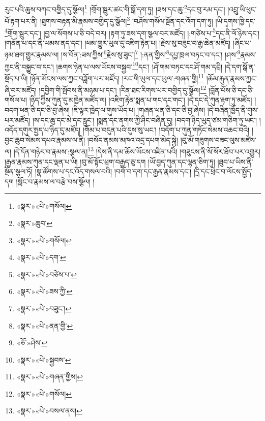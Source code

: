 རུང་པའི་ཆུས་བཀང་བགྱིད་དུ་སྩོལ།\footnote{«སྣར་»«པེ་»གསོལ།} །གྲོག་སྦུར་ཚང་གི་སྒོ་དག་ཏུ། །ཟས་དང་ཆུ་\footnote{«སྣར་»ཆུབ་}དང་བུ་རམ་དང་། །འབྲུ་ཡི་ཕུང་པོ་རྟག་པར་ནི། །ཐུགས་བརྟན་མི་རྣམས་བགྱིད་དུ་སྩོལ།\footnote{«སྣར་»«པེ་»གསོལ།} །བཤོས་གསོལ་སྔོན་དང་འོག་དག་ཏུ། །ཡི་དྭགས་ཁྱི་དང་\footnote{«སྣར་»«པེ་»དག་}གྲོག་སྦུར་དང་། །བྱ་ལ་སོགས་པ་ཅི་བདེ་བར། །རྟག་ཏུ་ཟས་དག་སྩལ་བར་མཛོད། །:གཙེས་པ་\footnote{«སྣར་»«པེ་»བཙེས་པ་}དང་ནི་ལོ་ཉེས་དང་། །གནོན་པ་དང་ནི་ཡམས་ནད་དང་། །ཕམ་གྱུར་ཡུལ་དུ་འཇིག་རྟེན་པ། །རྗེས་སུ་བཟུང་བ་རྒྱ་ཆེན་མཛོད། །ཞིང་པ་ཉམ་ཐག་གྱུར་རྣམས་ལ། །ས་བོན་:ཟས་ཀྱིས་\footnote{«སྣར་»«པེ་»ཟས་ཀྱི་}རྗེས་སུ་ཟུང་།\footnote{«སྣར་»«པེ་»བཟུང་།} །:ནན་གྱིས་\footnote{«སྣར་»«པེ་»ནན་གྱི་}དཔྱ་ཁྲལ་བཏང་བ་དང་། །ཤས་\footnote{«ཅོ་»ཤེས་}རྣམས་ཀྱང་ནི་བསྐྱུང་བ་དང་། །ཆགས་ཉེན་པ་ལས་ཡོངས་བསྐྱབ་\footnote{«སྣར་»«པེ་»སྐྱབས་}དང་། །ཤོ་གམ་བཏང་དང་ཤོ་གམ་དབྲི། །དེ་དག་སྒོ་ན་སྡོད་པ་ཡི། །ཉོན་མོངས་ལས་ཀྱང་བཟློག་པར་མཛོད། །རང་གི་ཡུལ་དང་ཡུལ་:གཞན་གྱི།\footnote{«སྣར་»«པེ་»གཞན་གྱིས།} །ཆོམ་རྐུན་རྣམས་ཀྱང་ཞི་བར་མཛོད། །དབྱིག་གི་སྤོབས་ནི་མཉམ་པ་དང་། །རིན་ཐང་རིགས་པར་བགྱིད་དུ་སྩོལ།\footnote{«སྣར་»«པེ་»གསོལ།} །བློན་པོས་ཅི་དང་ཅི་གསོལ་པ། །ཉིད་ཀྱིས་ཀུན་དུ་མཁྱེན་མཛོད་ལ། །འཇིག་རྟེན་སྨན་པ་གང་དང་གང་། །དེ་དང་དེ་ཀུན་རྟག་ཏུ་མཛོད། །བདག་ཕན་ཅི་དང་ཅི་བྱ་ཞེས། །ཇི་ལྟར་ཁྱེད་ལ་གུས་ཡོད་པ། །གཞན་ཕན་ཅི་དང་ཅི་བྱ་ཞེས། །དེ་བཞིན་ཁྱོད་ནི་གུས་པར་མཛོད། །ས་དང་ཆུ་དང་མེ་དང་རླུང་། །སྨན་དང་ནགས་ཀྱི་ཤིང་བཞིན་དུ། །བདག་ཉིད་ཡུད་ཙམ་གཅིག་ཏུ་ཡང་། །འདོད་དགུར་སྤྱད་པ་ཉིད་དུ་མཛོད། །གོམ་པ་བདུན་པའི་དུས་སུ་ཡང་། །བདོག་པ་ཀུན་གཏོང་སེམས་འཆང་བའི། །བྱང་ཆུབ་སེམས་དཔའ་རྣམས་ལ་ནི། །བསོད་ནམས་མཁའ་འདྲ་དཔག་མེད་སྐྱེ། །བུ་མོ་གཟུགས་བཟང་ལུས་མཛེས་ལ། །དེ་དོན་གཉེར་བ་རྣམས་:སྩལ་ན།\footnote{«སྣར་»«པེ་»བསལ་ནས།} །དེས་ནི་དམ་ཆོས་ཡོངས་འཛིན་པའི། །གཟུངས་ནི་སོ་སོར་ཐོབ་པར་འགྱུར། །རྒྱན་རྣམས་ཀུན་དང་ལྡན་པ་ཡི། །བུ་མོ་སྟོང་ཕྲག་བརྒྱད་ཅུ་དག །ཡོ་བྱད་ཀུན་དང་ལྷན་ཅིག་ཏུ། །ཐུབ་པ་ཡིས་ནི་སྔོན་སྩལ་ཏོ། །སྣ་ཚོགས་པ་དང་འོད་གསལ་བའི། །བགོ་བ་དག་དང་རྒྱན་རྣམས་དང་། །དྲི་དང་ཕྲེང་བ་ལོངས་སྤྱོད་དག །སློང་བ་རྣམས་ལ་བརྩེ་བས་སྩོལ། །

